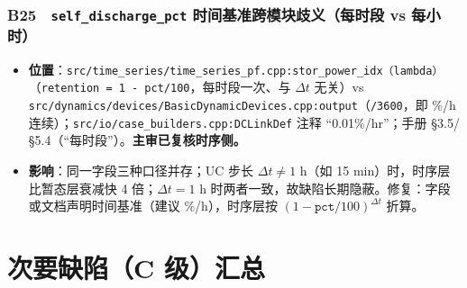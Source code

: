 \documentclass[11pt,a4paper,fontset=fandol]{ctexart}
\newcommand{\file}[1]{\texttt{#1}}
\begin{document}
\subsubsection*{B25　\texttt{self\_discharge\_pct} 时间基准跨模块歧义（每时段 vs 每小时）}
\begin{itemize}
  \item \textbf{位置}：\file{src/time\_series/time\_series\_pf.cpp:stor\_power\_idx（lambda）}（\texttt{retention = 1 - pct/100}，每时段一次、与 $\Delta t$ 无关）vs \file{src/dynamics/devices/BasicDynamicDevices.cpp:output}（\texttt{/3600}，即 \%/h 连续）；\file{src/io/case\_builders.cpp:DCLinkDef} 注释 ``0.01\%/hr''；手册 \S 3.5/\S 5.4（``每时段''）。\textbf{主审已复核时序侧。}
  \item \textbf{影响}：同一字段三种口径并存；UC 步长 $\Delta t\neq 1$ h（如 15 min）时，时序层比暂态层衰减快 4 倍；$\Delta t=1$ h 时两者一致，故缺陷长期隐蔽。修复：字段或文档声明时间基准（建议 \%/h），时序层按 $(1-\texttt{pct}/100)^{\Delta t}$ 折算。
\end{itemize}

\newpage
\section{次要缺陷（C 级）汇总}
\label{sec:minor}
\end{document}
